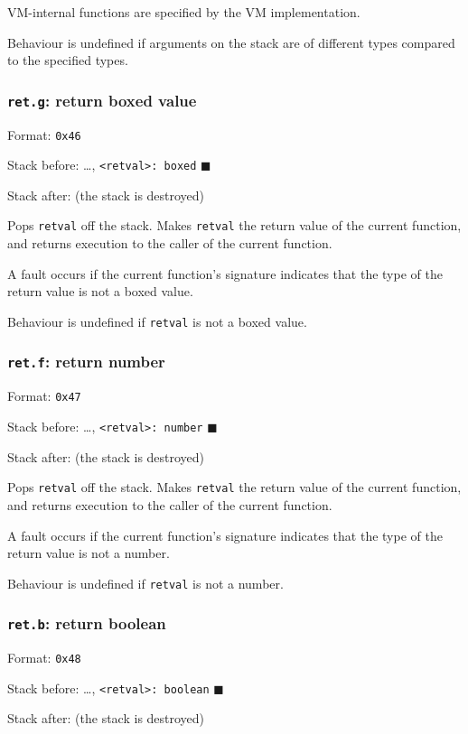 VM-internal functions are specified by the VM implementation.

Behaviour is undefined if arguments on the stack are of different types
compared to the specified types.

\subsubsection{\texttt{ret.g}: return boxed value}
\label{sec:org5c86ae1}
Format: \texttt{0x46}

Stack before: \ldots{}, \texttt{<retval>: boxed} \(\blacksquare\)

Stack after: (the stack is destroyed)

Pops \texttt{retval} off the stack. Makes \texttt{retval} the return value of the
current function, and returns execution to the caller of the current
function.

A fault occurs if the current function's signature indicates that the
type of the return value is not a boxed value.

Behaviour is undefined if \texttt{retval} is not a boxed value.

\subsubsection{\texttt{ret.f}: return number}
\label{sec:org24d7891}
Format: \texttt{0x47}

Stack before: \ldots{}, \texttt{<retval>: number} \(\blacksquare\)

Stack after: (the stack is destroyed)

Pops \texttt{retval} off the stack. Makes \texttt{retval} the return value of the
current function, and returns execution to the caller of the current
function.

A fault occurs if the current function's signature indicates that the
type of the return value is not a number.

Behaviour is undefined if \texttt{retval} is not a number.

\subsubsection{\texttt{ret.b}: return boolean}
\label{sec:org489d37c}
Format: \texttt{0x48}

Stack before: \ldots{}, \texttt{<retval>: boolean} \(\blacksquare\)

Stack after: (the stack is destroyed)

